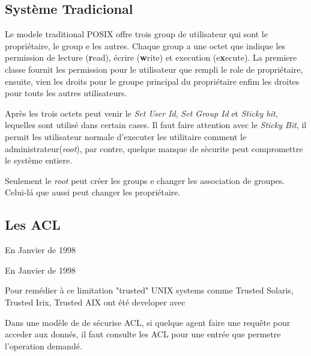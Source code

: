\documentclass[draft]{article}
\begin{document}

\subsection*{Système Tradicional}

Le modele traditional POSIX offre trois group de utilisateur qui sont le propriétaire, le group e les autres. Chaque group a une octet que indique les permission de lecture (\textbf{r}ead), écrire (\textbf{w}rite) et execution (e\textbf{x}ecute). La premiere classe fournit les permission pour le utilisateur que rempli le role de propriétaire, ensuite, vien les droits pour le groupe principal du propriétaire enfim les droites pour touts les autres utilisateurs. 
 
Après les trois octets peut venir le \emph{Set User Id}, \emph{Set Group Id} et \emph{Sticky bit}, lequelles sont utilisé dans certain cases. Il faut faire attention avec le \emph{Sticky Bit}, il permit les utilisateur normale d'executer les utilitaire comment le administrateur(\emph{root}), par contre, quelque manque de sècurite peut compromettre le système entiere.

Seulement le \emph{root} peut créer les groups e changer les association de groupes. Celui-lá que aussi peut changer les propriétaire.  

\subsection*{Les ACL}


En Janvier de 1998\cite{aclsuse}




En Janvier de 1998\cite{aclsuse}

Pour remédier à ce limitation "trusted" UNIX systems comme Trusted Solaris, Trusted Irix, Trusted AIX ont été developer avec 

Dans une modèle de de sécurise ACL, si quelque agent faire une requête pour acceder aux donnés, il faut consulte les ACL pour une entrée que permetre l'operation demandé.    
\end{document}
